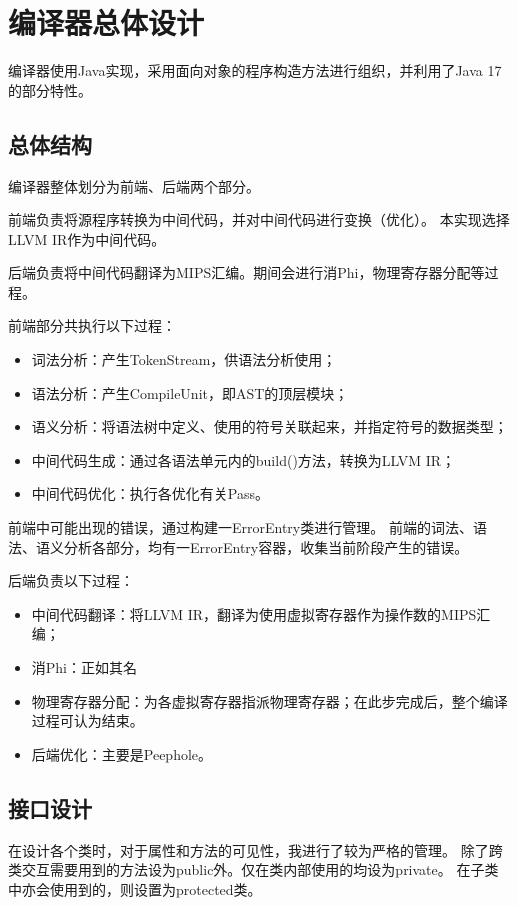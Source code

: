 \section{编译器总体设计}

编译器使用Java实现，采用面向对象的程序构造方法进行组织，并利用了Java 17的部分特性。

\subsection{总体结构}

编译器整体划分为前端、后端两个部分。

前端负责将源程序转换为中间代码，并对中间代码进行变换（优化）。
本实现选择LLVM IR作为中间代码。

后端负责将中间代码翻译为MIPS汇编。期间会进行消Phi，物理寄存器分配等过程。

前端部分共执行以下过程：
\begin{itemize}
    \item 词法分析：产生TokenStream，供语法分析使用；
    \item 语法分析：产生CompileUnit，即AST的顶层模块；
    \item 语义分析：将语法树中定义、使用的符号关联起来，并指定符号的数据类型；
    \item 中间代码生成：通过各语法单元内的build()方法，转换为LLVM IR；
    \item 中间代码优化：执行各优化有关Pass。
\end{itemize}

前端中可能出现的错误，通过构建一ErrorEntry类进行管理。
前端的词法、语法、语义分析各部分，均有一ErrorEntry容器，收集当前阶段产生的错误。

后端负责以下过程：
\begin{itemize}
    \item 中间代码翻译：将LLVM IR，翻译为使用虚拟寄存器作为操作数的MIPS汇编；
    \item 消Phi：正如其名
    \item 物理寄存器分配：为各虚拟寄存器指派物理寄存器；在此步完成后，整个编译过程可认为结束。
    \item 后端优化：主要是Peephole。
\end{itemize}

\subsection{接口设计}

在设计各个类时，对于属性和方法的可见性，我进行了较为严格的管理。
除了跨类交互需要用到的方法设为public外。仅在类内部使用的均设为private。
在子类中亦会使用到的，则设置为protected类。

